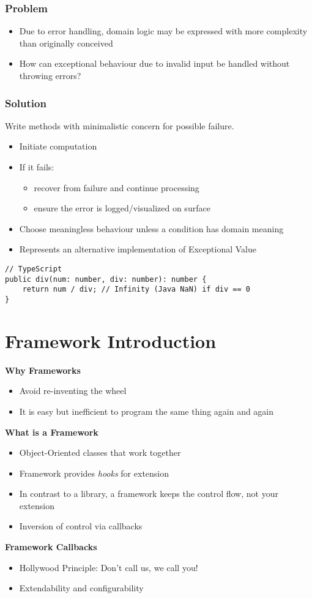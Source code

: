 \subsubsection{Problem}
\begin{itemize}
    \item Due to error handling, domain logic may be expressed with more complexity than originally conceived
    \item How can exceptional behaviour due to invalid input be handled without throwing errors?
\end{itemize}
\subsubsection{Solution}
Write methods with minimalistic concern for possible failure.
\begin{itemize}
    \item Initiate computation
    \item If it fails:
    \begin{itemize}
        \item recover from failure and continue processing
        \item ensure the error is logged/visualized on surface
    \end{itemize}
    \item Choose meaningless behaviour unless a condition has domain meaning 
    \item Represents an alternative implementation of Exceptional Value
\end{itemize}
\begin{lstlisting}
// TypeScript
public div(num: number, div: number): number {
    return num / div; // Infinity (Java NaN) if div == 0
}
\end{lstlisting}

\section{Framework Introduction}
\textbf{Why Frameworks}
\begin{itemize}
    \item Avoid re-inventing the wheel
    \item It is easy but inefficient to program the same thing again and again
\end{itemize}
\textbf{What is a Framework}
\begin{itemize}
    \item Object-Oriented classes that work together
    \item Framework provides \textit{hooks} for extension
    \item In contrast to a library, a framework keeps the control flow, not your extension
    \item Inversion of control via callbacks
\end{itemize}
\textbf{Framework Callbacks}
\begin{itemize}
    \item Hollywood Principle: Don't call us, we call you!
    \item Extendability and configurability
\end{itemize}
